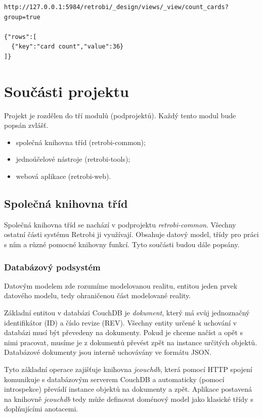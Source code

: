 \begin{verbatim}
http://127.0.0.1:5984/retrobi/_design/views/_view/count_cards?group=true

{"rows":[
  {"key":"card count","value":36}
]}
\end{verbatim}

\section{Součásti projektu}

Projekt je rozdělen do tří modulů (podprojektů). Každý tento modul bude popsán zvlášť.

\begin{itemize}
\item{společná knihovna tříd (retrobi-common);}
\item{jednoúčelové nástroje (retrobi-tools);}
\item{webová aplikace (retrobi-web).}
\end{itemize}

\subsection{Společná knihovna tříd}

Společná knihovna tříd se nachází v podprojektu {\em retrobi-common}. Všechny ostatní části systému Retrobi ji využívají. Obsahuje datový model, třídy pro práci s ním a různé pomocné knihovny funkcí. Tyto součásti budou dále popsány.

\subsubsection{Databázový podsystém}

{\color{OliveGreen} Datovým modelem zde rozumíme modelovanou realitu, entitou jeden prvek datového modelu, tedy ohraničenou část modelované reality.}

Základní entitou v databázi CouchDB je {\em dokument}, který má svůj jednoznačný identifikátor (ID) a číslo revize (REV). Všechny entity určené k uchování v databázi musí být převedeny na dokumenty. Pokud je chceme načíst a opět s nimi pracovat, musíme je z dokumentů převést zpět na instance určitých objektů. Databázové dokumenty jsou interně uchovávány ve formátu JSON. 

Tyto základní operace zajišťuje knihovna {\em jcouchdb}, která pomocí HTTP spojení komunikuje s databázovým serverem CouchDB a automaticky (pomocí introspekce) převádí instance objektů na dokumenty a zpět. Aplikace postavená na knihovně {\em jcouchdb} tedy může definovat doménový model jako klasické třídy s doplňujícími anotacemi.

